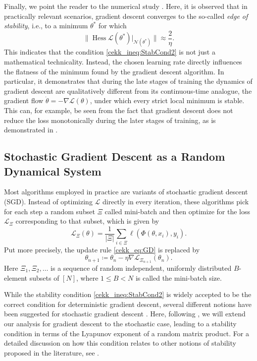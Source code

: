\documentclass[10pt]{article}
\begin{document}
Finally, we point the reader to the numerical study \cite{Cohen20}. Here, it is observed that in practically relevant scenarios, gradient descent converges to the so-called \emph{edge of stability}, i.e., to a minimum $\theta^*$ for which 
$$ \|\operatorname{Hess} \mathcal L(\theta^*)|_{\mathcal N(\theta^*)}\| \approx \frac{2}{\eta}.$$
This indicates that the condition \eqref{cekk_ineq:StabCond2} is not just a mathematical technicality. Instead, the chosen learning rate directly influences the flatness of the minimum found by the gradient descent algorithm. In particular, it demonstrates that during the late stages of training the dynamics of gradient descent are qualitatively different from its continuous-time analogue, the gradient flow $\dot \theta = - \nabla \mathcal L(\theta)$, under which every strict local minimum is stable. This can, for example, be seen from the fact that gradient descent does not reduce the loss monotonically during the later stages of training, as is demonstrated in \cite{Cohen20}. 

\subsection{Stochastic Gradient Descent as a Random Dynamical System} \label{cekk_subs:RDS}
Most algorithms employed in practice are variants of stochastic gradient descent (SGD). Instead of optimizing $\mathcal L$ directly in every iteration, these algorithms pick for each step a random subset $\Xi$ called mini-batch and then optimize for the loss $\mathcal L_\Xi$ corresponding to that subset, which is given by
$$\mathcal L_\Xi(\theta) = \frac{1}{|\Xi|} \sum_{i \in \Xi} \ell(\Phi(\theta,x_i),y_i).$$
Put more precisely, the update rule \eqref{cekk_eq:GD} is replaced by 
$$\theta_{n+1} \coloneqq \theta_n - \eta \nabla \mathcal L_{\Xi_{n+1}}(\theta_n).$$
Here $\Xi_1, \Xi_2,\dots$ is a sequence of random independent, uniformly distributed $B$-element subsets of $[N]$, where $1\leq B<N$ is called the mini-batch size.

While the stability condition \eqref{cekk_ineq:StabCond2} is widely accepted to be the correct condition for deterministic gradient descent, several different notions have been suggested for stochastic gradient descent \cite{Wu18, MaYing21, ChemnitzEngel24, Andreyev25}. Here, following \cite{ChemnitzEngel24}, we will extend our analysis for gradient descent to the stochastic case, leading to a stability condition in terms of the Lyapunov exponent of a random matrix product. For a detailed discussion on how this condition relates to other notions of stability proposed in the literature, see \cite[Appendix A]{ChemnitzEngel24}.
\end{document}
